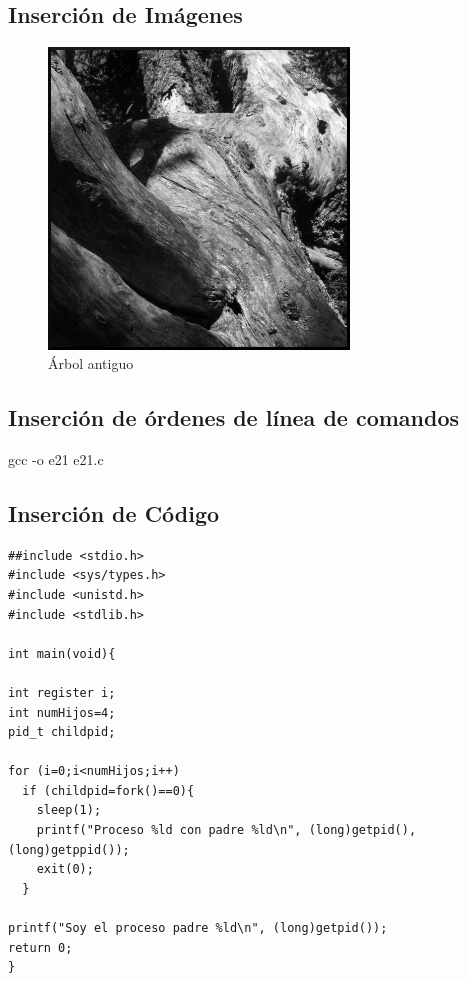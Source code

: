 \documentclass{pre-tfg}
\begin{document}
\subsection{Inserción de Imágenes}

\begin{figure}[!h]
\centering
   \includegraphics[width=8cm]{tree04.jpg}
\caption{Árbol antiguo}
\end{figure}

\subsection{Inserción de órdenes de línea de comandos}

\begin{listing}[style=consola, numbers=none]
 gcc  -o e21 e21.c
\end{listing}





\subsection{Inserción de Código}

\begin{lstlisting}[style=C]
##include <stdio.h>
#include <sys/types.h>
#include <unistd.h>
#include <stdlib.h>

int main(void){

int register i;
int numHijos=4;
pid_t childpid;

for (i=0;i<numHijos;i++)
  if (childpid=fork()==0){
    sleep(1);
    printf("Proceso %ld con padre %ld\n", (long)getpid(), (long)getppid());
    exit(0);
  }

printf("Soy el proceso padre %ld\n", (long)getpid());
return 0;
}
\end{lstlisting}
\end{document}
